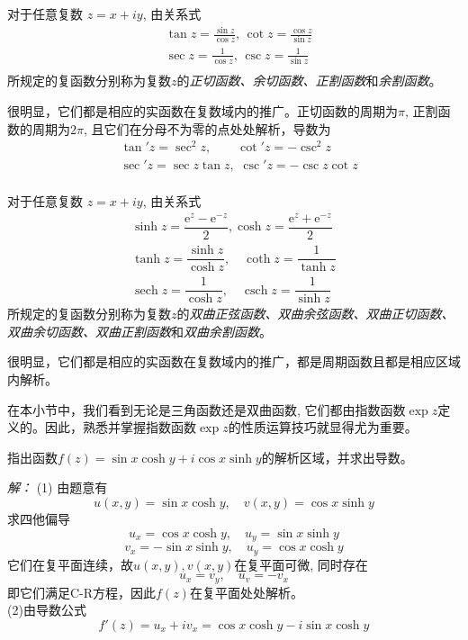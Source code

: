 \begin{definition}
  对于任意复数 $z= x +iy $, 由关系式
  \begin{equation}\label{}
    \begin{aligned}
      & \tan z = \frac{\sin z}{\cos z} , \, \cot z = \frac{\cos z} {\sin z} \\
      & \sec z = \frac{1}{\cos z} , \, \csc z = \frac{1} {\sin z} \\
    \end{aligned}
  \end{equation}
所规定的复函数分别称为复数$z$的\emph{正切函数、余切函数、正割函数}和\emph{余割函数}。
\end{definition}
很明显，它们都是相应的实函数在复数域内的推广。正切函数的周期为$\pi$, 正割函数的周期为$2\pi$, 且它们在分母不为零的点处处解析，导数为
\begin{equation}\label{}
  \begin{aligned}
    & \tan' z = \sec ^2 z , \qquad \cot' z = - \csc ^2 z\\
    & \sec' z = \sec z \tan z , \,\, \csc' z =  - \csc z \cot z \\
  \end{aligned}
\end{equation}

\begin{definition}
  对于任意复数 $z= x +iy $, 由关系式
  \begin{equation}\label{}
    \begin{array}{l}
      \sinh z=\dfrac{\mathrm{e}^{z}-\mathrm{e}^{-z}}{2}, \cosh z=\dfrac{\mathrm{e}^{z}+\mathrm{e}^{-z}}{2} \\
      \tanh z=\dfrac{\sinh z}{\cosh z}, \quad \operatorname{coth} z=\dfrac{1}{\tanh z} \\
      \operatorname{sech} z=\dfrac{1}{\cosh z},\quad \operatorname{csch} z=\dfrac{1}{\sinh z}
      \end{array}
  \end{equation}
所规定的复函数分别称为复数$z$的\emph{双曲正弦函数、双曲余弦函数、双曲正切函数、双曲余切函数、双曲正割函数}和\emph{双曲余割函数}。
\end{definition}
很明显，它们都是相应的实函数在复数域内的推广，都是周期函数且都是相应区域内解析。

在本小节中，我们看到无论是三角函数还是双曲函数, 它们都由指数函数$\exp{z}$定义的。因此，熟悉并掌握指数函数$\exp{z}$的性质运算技巧就显得尤为重要。

\begin{example}
  指出函数$f(z) = \sin x \cosh y + i \cos x \sinh y$的解析区域，并求出导数。
\end{example}
\emph{解：} (1) 由题意有 
\[ u(x,y) = \sin x \cosh y , \quad v(x,y) = \cos x \sinh y \]
求四他偏导 
\[ u_x =  \cos x \cosh y, \quad u_y = \sin x \sinh y  \]
\[ v_x =  -\sin x \sinh y, \quad u_y = \cos x \cosh y  \]
它们在复平面连续，故$u(x,y), v(x,y)$在复平面可微, 同时存在
\[ u_x =v_y, \quad u_v = -v_x\]
即它们满足C-R方程，因此$f(z)$在复平面处处解析。\\
(2)由导数公式 
\[ f'(z) = u_x + i v_x = \cos x \cosh y - i \sin x \cosh y\]

